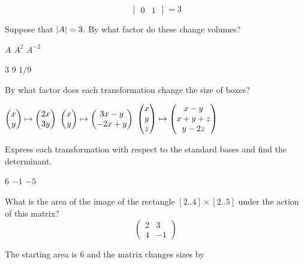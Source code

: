 \begin{exercises}
\begin{answer}
\begin{equation*}
\begin{vmatrix}
          0  &1
        \end{vmatrix}=3
      \end{equation*}
     \end{answer}
  \recommended \item 
    Suppose that \( \deter{A}=3 \).
    By what factor do these change volumes?
    \begin{exparts*}
      \partsitem \( A \)
      \partsitem \( A^2 \)
      \partsitem \( A^{-2} \)
    \end{exparts*}
    \begin{answer}
     \begin{exparts*}
        \partsitem \( 3 \)
        \partsitem \( 9 \)
        \partsitem $1/9$
      \end{exparts*}  
    \end{answer}
  \recommended \item 
    By what factor does each transformation change the size of
    boxes?
    \begin{exparts*}
      \partsitem $\begin{pmatrix} x \\ y \end{pmatrix}\mapsto\begin{pmatrix} 2x \\ 3y \end{pmatrix}$
      \partsitem $\begin{pmatrix} x \\ y \end{pmatrix}\mapsto\begin{pmatrix} 3x-y \\ -2x+y \end{pmatrix}$
      \partsitem $\begin{pmatrix} x \\ y \\ z \end{pmatrix}\mapsto\begin{pmatrix} x-y \\ x+y+z \\ y-2z \end{pmatrix}$
    \end{exparts*}
    \begin{answer}
      Express each transformation with respect to the standard bases
      and find the determinant. 
      \begin{exparts*}
        \partsitem $6$
        \partsitem $-1$
        \partsitem $-5$
      \end{exparts*}
    \end{answer}
  \item 
    What is the area of the image of the rectangle
    \( [2..4]\times [2..5] \) under the action of
    this matrix?
    \begin{equation*}
       \begin{pmatrix}
         2  &3  \\
         4  &-1
       \end{pmatrix}
    \end{equation*}
    \begin{answer}
      The starting area is \( 6 \) and the matrix changes sizes by

\end{answer}
\end{exercises}
